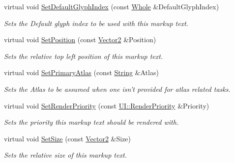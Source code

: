 \begin{DoxyCompactItemize}
virtual void \hyperlink{classMezzanine_1_1UI_1_1MarkupText_a8455dbc85e8ed56f366c14f1cab24f49}{SetDefaultGlyphIndex} (const \hyperlink{namespaceMezzanine_adcbb6ce6d1eb4379d109e51171e2e493}{Whole} \&DefaultGlyphIndex)
\begin{DoxyCompactList}\small\item\em Sets the Default glyph index to be used with this markup text. \item\end{DoxyCompactList}\item 
virtual void \hyperlink{classMezzanine_1_1UI_1_1MarkupText_a6fddca4eef841a78dcafc742c425437f}{SetPosition} (const \hyperlink{classMezzanine_1_1Vector2}{Vector2} \&Position)
\begin{DoxyCompactList}\small\item\em Sets the relative top left position of this markup text. \item\end{DoxyCompactList}\item 
virtual void \hyperlink{classMezzanine_1_1UI_1_1MarkupText_afff82489ff0edfafcaa5c4f3642c929e}{SetPrimaryAtlas} (const \hyperlink{namespaceMezzanine_acf9fcc130e6ebf08e3d8491aebcf1c86}{String} \&Atlas)
\begin{DoxyCompactList}\small\item\em Sets the Atlas to be assumed when one isn't provided for atlas related tasks. \item\end{DoxyCompactList}\item 
virtual void \hyperlink{classMezzanine_1_1UI_1_1MarkupText_a2941663607cde5e9306673a321e8fed2}{SetRenderPriority} (const \hyperlink{namespaceMezzanine_1_1UI_ac4c753eb6b5d66350a243acc9ce54130}{UI::RenderPriority} \&Priority)
\begin{DoxyCompactList}\small\item\em Sets the priority this markup text should be rendered with. \item\end{DoxyCompactList}\item 
virtual void \hyperlink{classMezzanine_1_1UI_1_1MarkupText_ab5ba11881937bea795c5431f0dfd7f4f}{SetSize} (const \hyperlink{classMezzanine_1_1Vector2}{Vector2} \&Size)
\begin{DoxyCompactList}\small\item\em Sets the relative size of this markup text. \item\end{DoxyCompactList}\item 

\end{DoxyCompactItemize}
